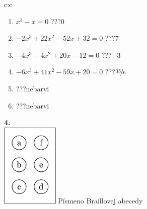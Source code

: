 \documentclass[10pt]{report}
\begin{document}
\begin{tabular}{c:c}
\begin{minipage}[c][104.5mm][t]{0.5\linewidth}
\begin{center}
\begin{minipage}{0.79\linewidth}
\begin{center}
\begin{varwidth}{\linewidth}
\begin{enumerate}
\Large
\item $x^3-x=0$\quad \dotfill\; ???\;\dotfill \quad $0$
\item $-2x^3+22x^2-52x+32=0$\quad \dotfill\; ???\;\dotfill \quad $7$
\item $-4x^3-4x^2+20x-12=0$\quad \dotfill\; ???\;\dotfill \quad $-3$
\item $-6x^3+41x^2-59x+20=0$\quad \dotfill\; ???\;\dotfill \quad $\nicefrac{35}{6}$
\item \quad \dotfill\; ???\;\dotfill \quad nebarvi
\item \quad \dotfill\; ???\;\dotfill \quad nebarvi
\end{enumerate}
\end{varwidth}
\end{center}
\end{minipage}
\begin{minipage}{0.20\linewidth}
\begin{center}
{\Huge\bfseries 4.} \\[2mm]
\includegraphics[height=40mm]{../images/braille.png}
{\small Písmeno Braillovej abecedy}
\end{center}
\end{minipage}
\end{center}
\end{minipage}
%
\end{tabular}
\newpage
\thispagestyle{empty}
\end{document}
